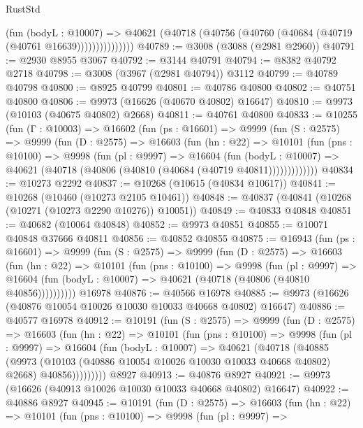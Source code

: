 \begin{lexlean}{RustStd}
\begin{coremodule}
                    (fun (bodyL : @10007) =>
                    @40621 (@40718 (@40756 (@40760 (@40684 (@40719 (@40761 @16639)))))))))))))))
@40789 := @3008 (@3088 (@2981 @2960))
@40791 := @2930 @8955 @3067
@40792 := @3144 @40791
@40794 := @8382 @40792 @2718
@40798 := @3008 (@3967 (@2981 @40794)) @3112
@40799 := @40789 @40798
@40800 := @8925 @40799
@40801 := @40786 @40800
@40802 := @40751 @40800
@40806 := @9973 (@16626 (@40670 @40802) @16647)
@40810 := @9973 (@10103 (@40675 @40802) @2668)
@40811 := @40761 @40800
@40833 := @10255
    (fun (Γ : @10003) =>
    @16602
      (fun (ps : @16601) =>
      @9999
        (fun (S : @2575) =>
        @9999
          (fun (D : @2575) =>
          @16603
            (fun (hn : @22) =>
            @10101
              (fun (pns : @10100) =>
              @9998
                (fun (pl : @9997) =>
                @16604
                  (fun (bodyL : @10007) =>
                  @40621 (@40718 (@40806 (@40810 (@40684 (@40719 @40811)))))))))))))
@40834 := @10273 @2292
@40837 := @10268 (@10615 (@40834 @10617))
@40841 := @10268 (@10460 (@10273 @2105 @10461))
@40848 := @40837 (@40841 (@10268 (@10271 (@10273 @2290 @10276)) @10051))
@40849 := @40833 @40848
@40851 := @40682 (@10064 @40848)
@40852 := @9973 @40851
@40855 := @10071 @40848 @37666 @40811
@40856 := @40852 @40855
@40875 := @16943
    (fun (ps : @16601) =>
    @9999
      (fun (S : @2575) =>
      @9999
        (fun (D : @2575) =>
        @16603
          (fun (hn : @22) =>
          @10101
            (fun (pns : @10100) =>
            @9998
              (fun (pl : @9997) =>
              @16604 (fun (bodyL : @10007) => @40621 (@40718 (@40806 (@40810 @40856))))))))))
    @16978
@40876 := @40566 @16978
@40885 := @9973 (@16626 (@40876 @10054 @10026 @10030 @10033 @40668 @40802) @16647)
@40886 := @40577 @16978
@40912 := @10191
    (fun (S : @2575) =>
    @9999
      (fun (D : @2575) =>
      @16603
        (fun (hn : @22) =>
        @10101
          (fun (pns : @10100) =>
          @9998
            (fun (pl : @9997) =>
            @16604
              (fun (bodyL : @10007) =>
              @40621
                (@40718
                  (@40885
                    (@9973
                      (@10103 (@40886 @10054 @10026 @10030 @10033 @40668 @40802) @2668)
                      @40856)))))))))
    @8927
@40913 := @40876 @8927
@40921 := @9973 (@16626 (@40913 @10026 @10030 @10033 @40668 @40802) @16647)
@40922 := @40886 @8927
@40945 := @10191
    (fun (D : @2575) =>
    @16603
      (fun (hn : @22) =>
      @10101
        (fun (pns : @10100) =>
        @9998
          (fun (pl : @9997) =>

\end{coremodule}
\end{lexlean}
